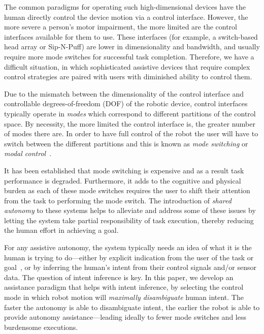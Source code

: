 \documentclass[conference]{IEEEtran}
\begin{document}
The common paradigms for operating such high-dimensional devices have the human directly control the device motion via a control interface. However, the more severe a person's motor impairment, the more limited are the control interfaces available for them to use. These interfaces (for example, a switch-based head array or Sip-N-Puff) are lower in dimensionality and bandwidth, and usually require more mode switches for successful task completion. Therefore, we have a difficult situation, in which sophisticated assistive devices that require complex control strategies are paired with users with diminished ability to control them.

Due to the mismatch between the dimensionality of the control interface and controllable degrees-of-freedom (DOF) of the robotic device, control interfaces typically operate in \textit{modes} which correspond to different partitions of the control space. By necessity, the more limited the control interface is, the greater number of modes there are. In order to have full control of the robot the user will have to switch between the different partitions and this is known as \textit{mode switching} or \textit{modal control}~\cite{tsui2008development, nuttin2002selection}. 

It has been established that mode switching is expensive and as a result task performance is degraded. Furthermore, it adds to the cognitive and physical burden as each of these mode switches requires the user to shift their attention from the task to performing the mode switch. The introduction of \textit{shared autonomy} to these systems helps to alleviate and address some of these issues by letting the system take partial responsibility of task execution, thereby reducing the human effort in achieving a goal. 

For any assistive autonomy, the system typically needs an idea of what it is the human is trying to do---either by explicit indication from the user of the task or goal~\cite{choi2008laser}, or by inferring the human's intent from their control signals and/or sensor data. The question of intent inference is key. In this paper, we develop an assistance paradigm that helps with intent inference, by selecting the control mode in which robot motion will \textit{maximally disambiguate} human intent. The faster the autonomy is able to disambiguate intent, the earlier the robot is able to provide autonomy assistance---leading ideally to fewer mode switches and less burdensome executions. 
\end{document}
